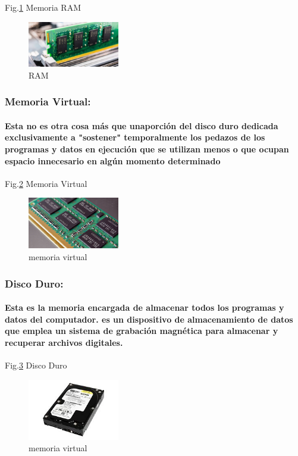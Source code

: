 \documentclass{article}
\begin{document}
Fig.\ref{fig:RAM} Memoria RAM
    \begin{figure}[h]
    \includegraphics[width=4cm]{RAM.jpg}
    \centering
    \caption{RAM}
    \label{fig:RAM}
    \end{figure}
\subsubsection{Memoria Virtual:}

\paragraph{Esta no es otra cosa más que unaporción del disco duro dedicada exclusivamente a "sostener" temporalmente los pedazos de los
programas y datos en ejecución que se utilizan menos o que ocupan espacio innecesario en
algún momento determinado\cite{taller} }

Fig.\ref{fig:memoria virtual} Memoria Virtual
    \begin{figure}[h]
    \includegraphics[width=4cm]{memoria virtual.jpg}
    \centering
    \caption{memoria virtual}
    \label{fig:memoria virtual}
    \end{figure}
    
\subsubsection{Disco Duro:}

\paragraph{Esta es la memoria encargada de almacenar todos los programas y datos del computador. es un dispositivo de almacenamiento de datos que emplea un sistema de grabación magnética para almacenar y recuperar archivos digitales.\cite{disco}}

Fig.\ref{fig:disco duro} Disco Duro
    \begin{figure}[h]
    \includegraphics[width=4cm]{disco duro.jpg}
    \centering
    \caption{memoria virtual}
    \label{fig:disco duro}
    \end{figure}
\end{document}

